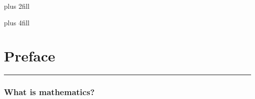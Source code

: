 \def\equals  {\hskip1pt \a{=}  \hskip1pt}
\def\pipe    {\hskip4pt \a{|}  \hskip4pt}

\def\lthen  {\Longrightarrow}                                  %
\def\liff   {\Longleftrightarrow}                              %
\def\lnthen {{\Relbar{\mkern-11mu}/{\mkern-11mu}\Rightarrow}}  %





\nopagenumbers

\topglue 0pt plus 2fill  %
{\titlefont {}}
{\subtitlefont {}}

\topglue 0pt plus 4fill  %
{}
{}
{}

\vfill\break
\pagenumbers




\chapter{Preface}

\vs\hrule\vskip1pt
\subsection{\bf What is mathematics?}

